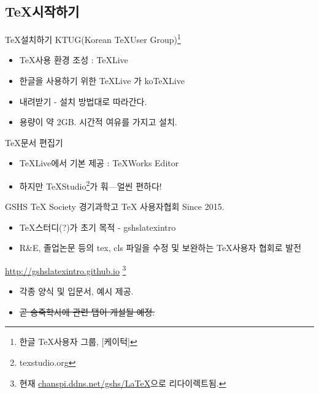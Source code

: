\documentclass[12pt]{beamer}
\begin{document}
\subsection{\TeX 시작하기}
\begin{frame}{\TeX 설치하기}
	KTUG(Korean \TeX User Group)\footnote{한글 \TeX 사용자 그룹, [케이턱]}
	\begin{itemize}
		\item \TeX 사용 환경 조성 : TeXLive
		\item 한글을 사용하기 위한 TeXLive 가 koTeXLive
		\item 내려받기 - 설치 방법대로 따라간다.
		\item 용량이 약 2GB. 시간적 여유를 가지고 설치.
	\end{itemize}
	\TeX 문서 편집기
	\begin{itemize}
		\item TeXLive에서 기본 제공 : TeXWorks Editor
		\item 하지만 TeXStudio\footnote{texstudio.org}가 훠---얼씬 편하다!
	\end{itemize}
\end{frame}
\begin{frame}{GSHS TeX Society}
	경기과학고 TeX 사용자협회 Since 2015.
	\begin{itemize}
		\item \TeX 스터디(?)가 초기 목적 - gshslatexintro
		\item R\&E, 졸업논문 등의 tex, cls 파일을 수정 및 보완하는 \TeX 사용자 협회로 발전
	\end{itemize}
	\url{http://gshslatexintro.github.io} \footnote{현재 \url{chanspi.ddns.net/gshs/LaTeX}으로 리다이렉트됨.}
	\begin{itemize}
		\item 각종 양식 및 입문서, 예시 제공.
		\item \sout{곧 송죽학사에 관련 탭이 개설될 예정.}
	\end{itemize}
\end{frame}
\end{document}
